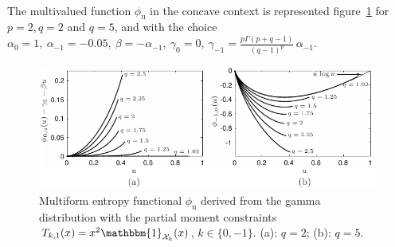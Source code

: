 \documentclass[entropy,article,submit,moreauthors,pdftex]{Definitions/mdpi}
\newcommand{\SZ}[1]{{\color{blue} #1}}                                       %
\newcommand{\Avoir}[1]{{\color{red}\bf #1}}                                  %
\def\X{\mathcal{X}}%
\def\un{\mathbbm{1}}%
\def\u{\mathrm{u}}
\begin{document}
\


The  multivalued  function  $\phi_\u$  in the  concave  context  is  represented
figure~\ref{fig:Entropy-gamma} for  $p = 2,  q =  2$ and $q  = 5$, and  with the
choice \SZ{$\alpha_0 = 1,  \: \alpha_{-1} = -0.05, \: \beta  = - \alpha_{-1}, \:
  \gamma_0   =  0,   \:   \gamma_{-1}  =   \frac{p  \Gamma(p+q-1)}{(q-1)^p}   \,
  \alpha_{-1}$}.

\begin{figure}[htbp]
\centerline{\includegraphics[width=.78\textwidth]{PDF/MaxEnt_GammaLaw}}
\caption{Multiform  entropy   functional  $\phi_\u$   derived  from   the  gamma
  distribution   with  the   partial  moment   constraints  $T_{k,1}(x)   =  x^2
  \un_{\X_k}(x)$, $k\in\{0,-1\}$.  (a): $q = 2$; (b): $q = 5$.}
\label{fig:Entropy-gamma} 
\end{figure}








\end{document}
